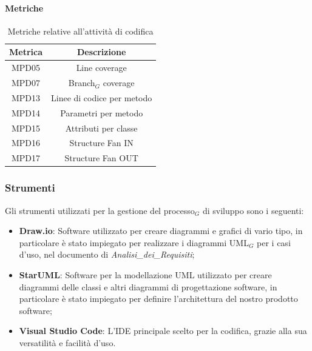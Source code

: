 \documentclass[10pt]{article}
\begin{document}
\begin{justify}
        \paragraph{Metriche}
        \begin{table}[H]
          \centering
          \begin{tabular}{|c|c|}
            \hline
            \textbf{Metrica} & \textbf{Descrizione} \\
            \hline
            MPD05 & Line coverage\\
            \hline
            MPD07 & Branch$_G$ coverage\\
            \hline
            MPD13 & Linee di codice per metodo\\
            \hline
            MPD14 & Parametri per metodo\\
            \hline
            MPD15 & Attributi per classe\\
            \hline
            MPD16 & Structure Fan IN\\
            \hline
            MPD17 & Structure Fan OUT\\
            \hline
          \end{tabular}
          \caption{Metriche relative all'attività di codifica}
        \end{table}

    \subsubsection{Strumenti}
    Gli strumenti utilizzati per la gestione del processo$_G$ di sviluppo sono i seguenti:
    \begin{itemize}
        \item \textbf{Draw.io}: Software utilizzato per creare diagrammi e grafici di vario tipo, in particolare è stato impiegato per realizzare i diagrammi UML$_G$ per i casi d'uso, nel documento di \textit{Analisi\_dei\_Requisiti};
        \item \textbf{StarUML}: Software per la modellazione UML utilizzato per creare diagrammi delle classi e altri diagrammi di progettazione software, in particolare è stato impiegato per definire l'architettura del nostro prodotto software;
        \item \textbf{Visual Studio Code}: L'IDE principale scelto per la codifica, grazie alla sua versatilità e facilità d'uso.
    \end{itemize}


\end{justify}
\end{document}
